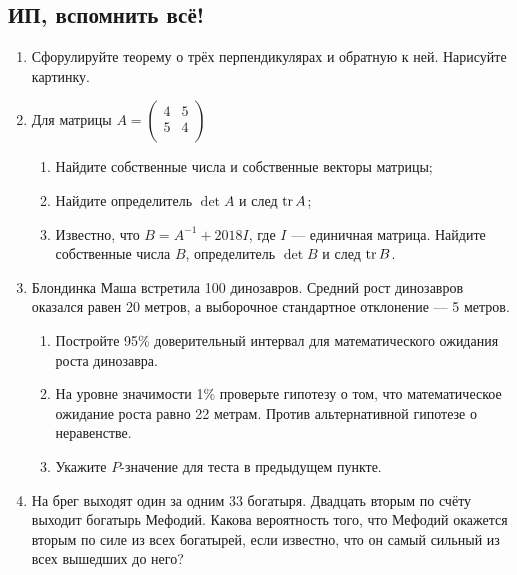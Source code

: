 \subsection{ИП, вспомнить всё!}

\begin{enumerate}

  \item Сфорулируйте теорему о трёх перпендикулярах и обратную к ней. Нарисуйте картинку.

  \item Для матрицы
$
  A=\begin{pmatrix}
  4 & 5  \\
  5 & 4  \\
  \end{pmatrix}
$

  \begin{enumerate}
  \item Найдите собственные числа и собственные векторы матрицы;
  \item Найдите определитель $\det A$ и след $\operatorname{tr} A$;
 \item Известно, что $B = A^{-1} + 2018I$, где $I$ — единичная матрица.
 Найдите собственные числа $B$, определитель $\det B$ и след $\operatorname{tr} B$.

  \end{enumerate}


  \item Блондинка Маша встретила 100 динозавров.
  Средний рост динозавров оказался равен 20 метров, а выборочное стандартное отклонение — 5 метров.

  \begin{enumerate}
    \item Постройте 95\% доверительный интервал для математического ожидания роста динозавра.
    \item На уровне значимости 1\% проверьте гипотезу о том, что математическое ожидание
    роста равно 22 метрам. Против альтернативной гипотезе о неравенстве.
    \item Укажите $P$-значение для теста в предыдущем пункте.
  \end{enumerate}

 \item На брег выходят один за одним 33 богатыря. Двадцать вторым по счёту выходит
 богатырь Мефодий. Какова вероятность того, что Мефодий окажется вторым по силе из всех богатырей,
   если известно, что он самый сильный из всех вышедших до него?

\end{enumerate}


